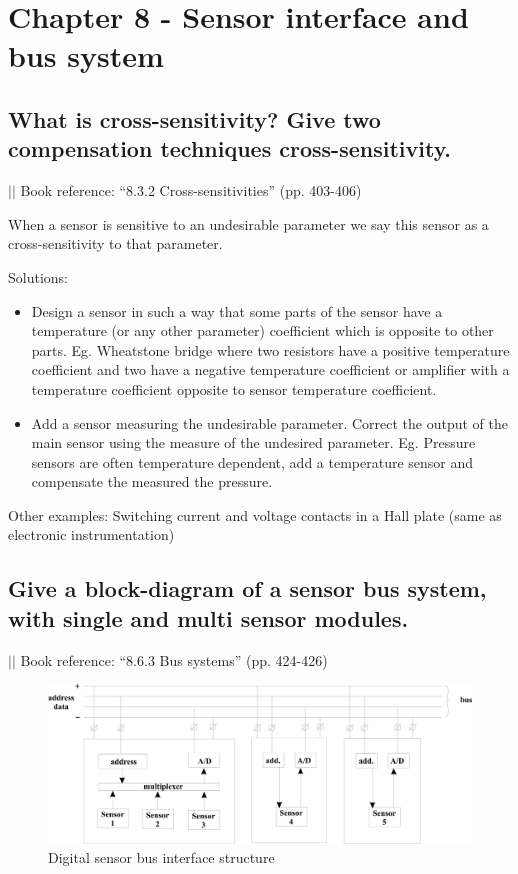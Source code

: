 \documentclass[10pt,a4paper]{article}
\author{Jonathan Dan}
\newcommand{\bookref}[2]{\indent\indent\indent\indent $\vert\vert$ Book reference: ``#1'' (pp. #2) \newline}
\begin{document}
\section{Chapter 8 - Sensor interface and bus system}

\subsection{What is cross-sensitivity? Give two compensation techniques cross-sensitivity.}

\bookref{8.3.2 Cross-sensitivities}{403-406}

When a sensor is sensitive to an undesirable parameter we say this sensor as a cross-sensitivity to that parameter.\newline

Solutions:
\begin{itemize}
	\item Design a sensor in such a way that some parts of the sensor have a temperature (or any other parameter) coefficient which is opposite to other parts. Eg. Wheatstone bridge where two resistors have a positive temperature coefficient and two have a negative temperature coefficient or amplifier with a temperature coefficient opposite to sensor temperature coefficient.
	\item Add a sensor measuring the undesirable parameter. Correct the output of the main sensor using the measure of the undesired parameter. Eg. Pressure sensors are often temperature dependent, add a temperature sensor and compensate the measured the pressure.
\end{itemize}
Other examples: Switching current and voltage contacts in a Hall plate (same as electronic instrumentation)

\subsection{Give a block-diagram of a sensor bus system, with single and multi sensor modules.}

\bookref{8.6.3 Bus systems}{424-426}

\begin{figure}[h!]
    \centering
    \includegraphics[width=\textwidth]{bus.png}
    \caption{Digital sensor bus interface structure}
\end{figure}
\end{document}

